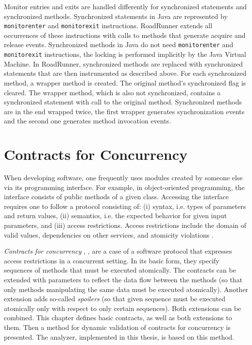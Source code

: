 Monitor entries and exits are handled differently for synchronized statements
and synchronized methods. Synchronized statements in Java are represented by
\texttt{monitorenter} and \texttt{monitorexit} instructions. RoadRunner extends 
all occurrences of these instructions with calls to methods that generate
acquire and release events. Synchronized methods in Java do not need
\texttt{monitorenter} and \texttt{monitorexit} instructions, the locking is
performed implicitly by the Java Virtual Machine. In RoadRunner, synchronized
methods are replaced with synchronized statements that are then instrumented as
described above. For each synchronized method, a wrapper method is created. The
original method's synchronized flag is cleared. The wrapper method, which is
also not synchronized, contains a synchronized statement with call to the
original method. Synchronized methods are in the end wrapped twice, the first
wrapper generates synchronization events and the second one generates method
invocation events.

\chapter{Contracts for Concurrency}
\label{chThree}

When developing software, one frequently uses modules created by someone else
via its programming interface. For example, in object-oriented programming, the
interface consists of public methods of a given class. Accessing the interface
requires one to follow a protocol consisting of: (i) syntax, i.e. types of
parameters and return values, (ii) semantics, i.e. the expected behavior for
given input parameters, and (iii) access restrictions. Access restrictions
include the domain of valid values, dependencies on other services, and
atomicity violations \cite{contracts}.

\emph{Contracts for concurrency} \cite{FITPUB10817},
\cite{DBLP:journals/corr/SousaDFL15}, are a case of a software protocol that
expresses access restrictions in a concurrent setting. In its basic form, they
specify sequences of methods that must be executed atomically. The contracts can
be extended with parameters to reflect the data flow between the methods (so
that only methods manipulating the same data must be executed atomically).
Another extension adds so-called \emph{spoilers} (so that given sequence must be
executed atomically only with respect to only certain sequences). Both
extensions can be combined. This chapter defines basic contracts, as well as
both extensions to them. Then a method for dynamic validation of contracts for
concurrency is presented. The analyzer, implemented in this thesis, is based on
this method.

